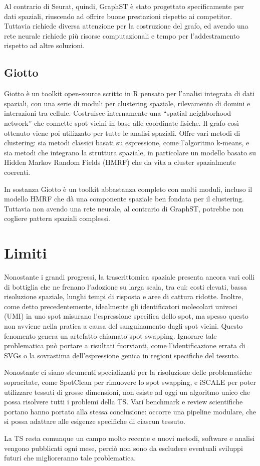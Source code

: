 Al contrario di Seurat, quindi, GraphST è stato progettato specificamente per dati spaziali, riuscendo ad offrire buone prestazioni rispetto ai competitor.
Tuttavia richiede diversa attenzione per la costruzione del grafo, ed avendo una rete neurale richiede più risorse computazionali e tempo per l'addestramento rispetto ad altre soluzioni.

\subsection{Giotto}\label{subsec:giotto}
Giotto è un toolkit open-source scritto in R pensato per l'analisi integrata di dati spaziali, con una serie di moduli per clustering spaziale, rilevamento di domini e interazioni tra cellule.
Costruisce internamente una “spatial neighborhood network” che connette spot vicini in base alle coordinate fisiche. Il grafo così ottenuto viene poi utilizzato per tutte le analisi spaziali.
Offre vari metodi di clustering: sia metodi classici basati su espressione, come l'algoritmo k-means, e sia metodi che integrano la struttura spaziale, in particolare un modello basato su Hidden Markov Random Fields (HMRF) che da vita a cluster spazialmente coerenti.

In sostanza Giotto è un toolkit abbastanza completo con molti moduli, incluso il modello HMRF che dà una componente spaziale ben fondata per il clustering.
Tuttavia non avendo una rete neurale, al contrario di GraphST, potrebbe non cogliere pattern spaziali complessi.

\section{Limiti}\label{sec:cap_four_bioinfo}
Nonostante i grandi progressi, la trascrittomica spaziale presenta ancora vari colli di bottiglia che ne frenano l'adozione su larga scala, tra cui: costi elevati, 
bassa risoluzione spaziale, lunghi tempi di risposta e aree di cattura ridotte.
Inoltre, come detto precedentemente,  idealmente gli identificatori molecolari univoci (UMI) in uno spot misurano l'espressione specifica dello spot, 
ma spesso questo non avviene nella pratica a causa del sanguinamento dagli spot vicini. Questo fenomento genera un artefatto chiamato spot swapping.
Ignorare tale problematica può portare a risultati fuorvianti, come l'identificazione errata di SVGs o la sovrastima dell'espressione genica in regioni specifiche del tessuto.

Nonostante ci siano strumenti specializzati per la risoluzione delle problematiche sopracitate, come SpotClean\cite{SpotClean} per rimuovere lo spot swapping, e iSCALE\cite{iSCALE} per poter utilizzare tessuti di grosse dimensioni,
non esiste ad oggi un algoritmo unico che possa risolvere tutti i problemi della TS.
Vari benchmark e review scientifiche portano hanno portato alla stessa conclusione: occorre una pipeline modulare, che si possa adattare alle esigenze specifiche di ciascun tessuto.

\medskip
La TS resta comunque un campo molto recente e nuovi metodi, software e analisi vengono pubblicati ogni mese, perciò non sono da escludere eventuali sviluppi futuri che miglioreranno tale problematica.\cite{limitiTS}